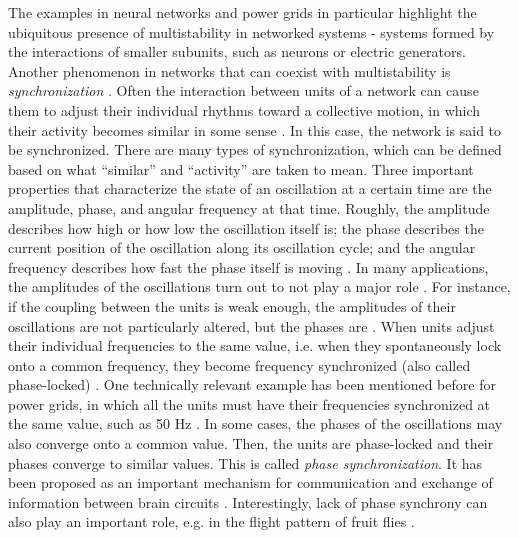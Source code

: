 The examples in neural networks and power grids in particular highlight the ubiquitous presence of multistability in networked systems - systems formed by the interactions of smaller subunits, such as neurons or electric generators.  Another phenomenon in networks that can coexist with multistability is \textit{synchronization} \cite{pikovsky2001synchronization, boccaletti2018synchronization}. Often the interaction between units of a network can cause them to adjust their individual rhythms toward a collective motion, in which their activity becomes similar in some sense \cite{pikovsky2001synchronization}. In this case, the network is said to be synchronized. There are many types of synchronization, which can be defined based on what ``similar'' and ``activity'' are taken to mean. Three important properties that characterize the state of an oscillation at a certain time are the amplitude, phase, and angular frequency at that time. Roughly, the amplitude describes how high or how low the oscillation itself is; the phase describes the current position of the oscillation along its oscillation cycle; and the angular frequency describes how fast the phase itself is moving \cite{pikovsky2001synchronization}.
In many applications, the amplitudes of the oscillations turn out to not play a major role \cite{pikovsky2001synchronization, arenas2008synchronization}. For instance, if the coupling between the units is weak enough, the amplitudes of their oscillations are not particularly altered, but the phases are \cite{pikovsky2001synchronization, strogatz2000from}. When units adjust their individual frequencies to the same value, i.e. when they spontaneously lock onto a common frequency, they become frequency synchronized (also called phase-locked) \cite{pikovsky2001synchronization, strogatz2000from}. One technically relevant example has been mentioned before for power grids, in which all the units must have their frequencies synchronized at the same value, such as 50 Hz \cite{hellmann2020network}. In some cases, the phases of the oscillations may also converge onto a common value. Then, the units are phase-locked and their phases converge to similar values. This is called \textit{phase synchronization}. It has been proposed as an important mechanism for communication and exchange of information between brain circuits \cite{singer1999neuronal, fries2015rhythms, womelsdorf2007the}. Interestingly, lack of phase synchrony can also play an important role, e.g. in the flight pattern of fruit flies \cite{hurkey2023gap}. 

